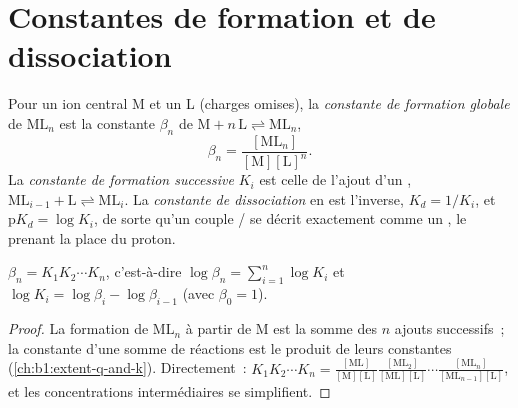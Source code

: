 \section{Constantes de formation et de dissociation}

\begin{definition}\label{def:b1:complexation:formation-constant}
Pour un ion central M et un  L (charges omises), la \emph{constante
de formation globale} de
$\mathrm{ML}_n$ est la constante $\beta_n$ de
$\mathrm{M} + n\,\mathrm{L} \rightleftharpoons \mathrm{ML}_n$,
\[
  \beta_n = \frac{[\mathrm{ML}_n]}{[\mathrm{M}][\mathrm{L}]^n} .
\]
La \emph{constante de formation successive}
$K_i$ est celle de l'ajout d'un ,
$\mathrm{ML}_{i-1} + \mathrm{L} \rightleftharpoons \mathrm{ML}_i$. La
\emph{constante de dissociation} en est
l'inverse, $K_d = 1/K_i$, et $\mathrm{p}K_d = \log K_i$, de sorte qu'un
couple / se décrit exactement comme un , le  prenant la place du proton.
\end{definition}

\begin{proposition}\label{prop:b1:complexation:beta-k}
$\beta_n = K_1 K_2 \cdots K_n$, c'est-à-dire
$\log\beta_n = \sum_{i=1}^n \log K_i$ et $\log K_i = \log\beta_i -
\log\beta_{i-1}$ (avec $\beta_0 = 1$).
\end{proposition}

\begin{proof}
La formation de $\mathrm{ML}_n$ à partir de M est la somme des $n$ ajouts
successifs~; la constante d'une somme de réactions est le produit de
leurs constantes (\cref{ch:b1:extent-q-and-k}). Directement~:
$K_1 K_2\cdots K_n = \frac{[\mathrm{ML}]}{[\mathrm{M}][\mathrm{L}]}
\frac{[\mathrm{ML_2}]}{[\mathrm{ML}][\mathrm{L}]}\cdots
\frac{[\mathrm{ML}_n]}{[\mathrm{ML}_{n-1}][\mathrm{L}]}$, et les
concentrations intermédiaires se simplifient.
\end{proof}

